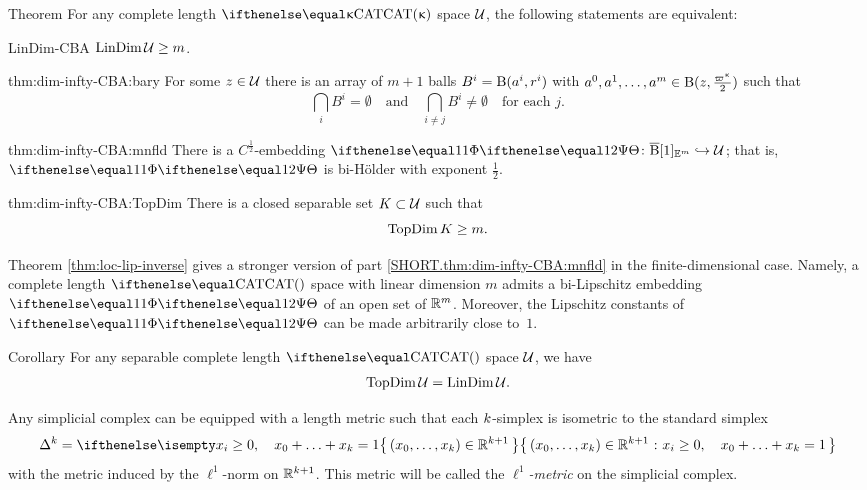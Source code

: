 \begin{thm}{Theorem}\label{thm:dim-infty-CBA}
For any complete length $\CAT\kappa$ space $\mathcal{U}$, the following statements are equivalent:

\begin{subthm}{LinDim-CBA} $\LinDim\spc{U}\ge m$.
\end{subthm}

\begin{subthm}{thm:dim-infty-CBA:bary} 
For some $z\in \spc{U}$ there is an array of $m+1$ balls $B^i\z=\oBall(a^i,r^i)$ with $a^0,a^1,\dots,a^m\in \oBall(z,\frac{\varpi\kappa}2)$ 
such that 
\[\bigcap_i B^i=\emptyset
\quad\text{and}\quad
\bigcap_{i\ne j} B^i\ne \emptyset
\quad \text{for each $j$}.\]

\end{subthm}


\begin{subthm}{thm:dim-infty-CBA:mnfld} 
There is a $C^{\frac{1}{2}}$-embedding $\map\:\cBall[1]_{\EE^m}\hookrightarrow \spc{U}$;
that is, $\map$ is bi-Hölder with exponent $\tfrac{1}{2}$.
\end{subthm}

\begin{subthm}{thm:dim-infty-CBA:TopDim}
There is a closed separable set $K\subset\spc{U}$ such that 
\[\TopDim K\ge m.\]
\end{subthm}

\end{thm}

Theorem \ref{thm:loc-lip-inverse} gives a stronger version of part \ref{SHORT.thm:dim-infty-CBA:mnfld} in the finite-dimensional case.
Namely, a complete length $\CAT{}$ space with linear dimension $m$ 
admits a bi-Lipschitz embedding $\map$ of an open set of $\mathbb{R}^m$.
Moreover, the Lipschitz constants of $\map$ can be made arbitrarily close to~$1$.

\begin{thm}{Corollary}\label{cor:dim-CBA}
For any separable complete length $\CAT{}$ space $\mathcal{U}$, we have
\[\mathop{\rm TopDim}\nolimits\mathcal{U}=\mathop{\rm LinDim}\nolimits\mathcal{U}.\]

\end{thm}


Any simplicial complex can be equipped with a length metric
such that each $k$-simplex 
is isometric to the standard simplex
\[\Delta^\kay
=
\set{(x_0,\dots,x_\kay)\in \RR^{\kay+1}}
{x_i\ge 0,\quad x_0+\dots+x_\kay=1}\]
with the metric induced by the $\ell^1$-norm on $\mathbb{R}^{k+1}$.
This metric will be called the \emph{$\ell^1$-metric} on the simplicial complex.

